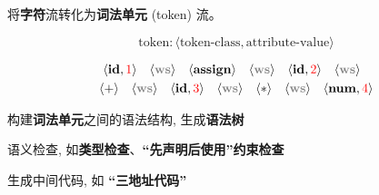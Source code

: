 \begin{frame}{}
  \begin{center}
     将{\bf 字符}流转化为{\bf 词法单元} (token) 流。

    \[
      \boxed{\text{token}: \langle \text{token-class}, \text{attribute-value} \rangle}
    \]

    \begin{align*}
    \langle \id, \red{1} \rangle \quad 
    \langle \ws \rangle \quad
    \langle \assign \rangle \quad
    \langle \ws \rangle \quad
    \langle \id, \red{2} \rangle \quad
    \langle \ws \rangle \quad \\
    \langle + \rangle \quad
    \langle \ws \rangle \quad
    \langle \id, \red{3} \rangle \quad
    \langle \ws \rangle \quad
    \langle \ast \rangle \quad
    \langle \ws \rangle \quad
    \langle \num, \red{4} \rangle
    \end{align*}
  \end{center}
\end{frame}

\begin{frame}{}
  \begin{center}
     构建{\bf 词法单元}之间的语法结构, 生成{\bf 语法树}

    \vspace{0.80cm}
  \end{center}
\end{frame}

\begin{frame}{}
  \begin{center}
     语义检查, 如{\bf 类型检查}、{\bf ``先声明后使用''约束检查}

    \vspace{0.80cm}
  \end{center}
\end{frame}

\begin{frame}{}
  \begin{center}
     生成中间代码, 如 {\bf ``三地址代码''}

    \vspace{0.80cm}
  \end{center}
\end{frame}

